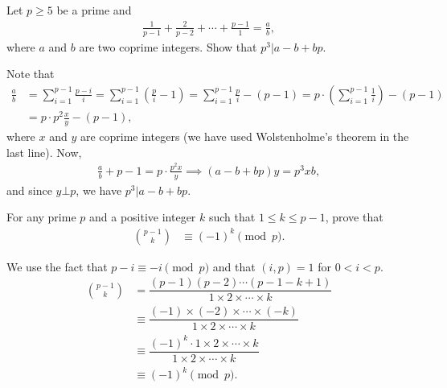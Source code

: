 \documentclass[12pt]{subfile}
\begin{document}
		\begin{problem}
			Let $p \geq 5$ be a prime and
			\begin{align*}
			\frac{1}{p-1} + \frac{2}{p-2} + \cdots + \frac{p-1}{1}=\frac{a}{b},
			\end{align*}
			where $a$ and $b$ are two coprime integers. Show that $p^3 | a-b+bp$.
		\end{problem}
		
		\begin{solution}
			Note that
				\begin{align*}
					\frac{a}{b} &= \sum_{i=1}^{p-1} \frac{p-i}{i} =\sum_{i=1}^{p-1} \left(\frac{p}{i} -1 \right)=\sum_{i=1}^{p-1} \frac{p}{i} - (p-1) =p\cdot\left(\sum_{i=1}^{p-1} \frac{1}{i}\right) - (p-1)\\
					&=p \cdot p^2 \frac{x}{y} - (p-1),
				\end{align*}
			where $x$ and $y$ are coprime integers (we have used Wolstenholme's theorem in the last line). Now,
				\begin{align*}
					\frac a b+p-1=p\cdot\frac{p^2x}y \implies (a-b+bp)y=p^3xb,
				\end{align*}
			and since $y\bot p$, we have $p^3 | a-b+bp$.
			
		\end{solution}
	


		\begin{problem}\label{prob:binom(p-1)(k)}
			For any prime $p$ and a positive integer $k$ such that $1 \leq k \leq p-1$, prove that
				\begin{align*}
					\binom{p-1}{k} & \equiv(-1)^k\pmod p.
				\end{align*}
		\end{problem}
		
		\begin{solution}
			We use the fact that $p-i\equiv-i\pmod p$ and that $(i,p)=1$ for $0<i<p$.
				\begin{align*}
					\binom{p-1}{k} & = \dfrac{(p-1)(p-2)\cdots(p-1-k+1)}{1\times 2 \times \cdots \times k}\\
					& \equiv \dfrac{(-1) \times (-2) \times \cdots \times (-k)}{1\times 2 \times \cdots \times k}\\
					& \equiv\dfrac{(-1)^k \cdot 1\times 2 \times \cdots \times k}{1\times 2 \times \cdots \times k}\\
					& \equiv(-1)^k\pmod p.
				\end{align*}
			
		\end{solution}
			
\end{document}
